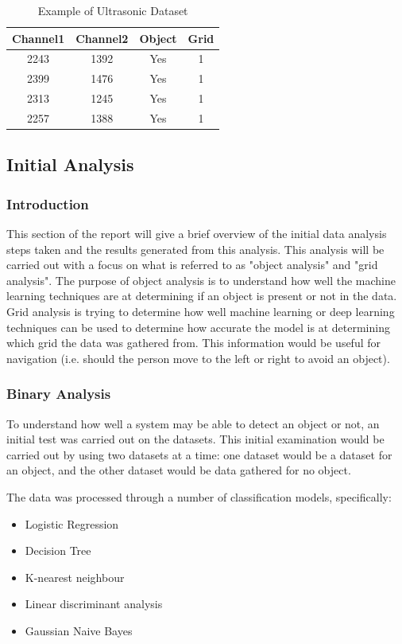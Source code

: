 \documentclass[conference]{IEEEtran}
\begin{document}
\begin{table}[ht]
\centering
\begin{tabular}{||c c c c||} 
 \hline
 Channel1 & Channel2 & Object & Grid \\ [0.5ex] 
 \hline\hline
 2243 & 1392 & Yes & 1 \\ 
 \hline
 2399 & 1476 & Yes & 1 \\
 \hline
 2313 & 1245 & Yes & 1 \\
 \hline
 2257 & 1388 & Yes & 1 \\ [1ex] 
 \hline
\end{tabular}
\caption{Example of Ultrasonic Dataset}
\label{table:1}
\end{table}

\subsection{Initial Analysis}
\subsubsection{Introduction}
This section of the report will give a brief overview of the initial data analysis steps taken and the results generated from this analysis. This analysis will be carried out with a focus on what is referred to as "object analysis" and "grid analysis". The purpose of object analysis is to understand how well the machine learning techniques are at determining if an object is present or not in the data. Grid analysis is trying to determine how well machine learning or deep learning techniques can be used to determine how accurate the model is at determining which grid the data was gathered from. This information would be useful for navigation (i.e. should the person move to the left or right to avoid an object).

\subsubsection{Binary Analysis}
To understand how well a system may be able to detect an object or not, an initial test was carried out on the datasets. This initial examination would be carried out by using two datasets at a time: one dataset would be a dataset for an object, and the other dataset would be data gathered for no object. 

The data was processed through a number of classification models, specifically:
\begin{itemize}
    \item Logistic Regression
    \item Decision Tree
    \item K-nearest neighbour
    \item Linear discriminant analysis
    \item Gaussian Naive Bayes
\end{itemize}
\end{document}
